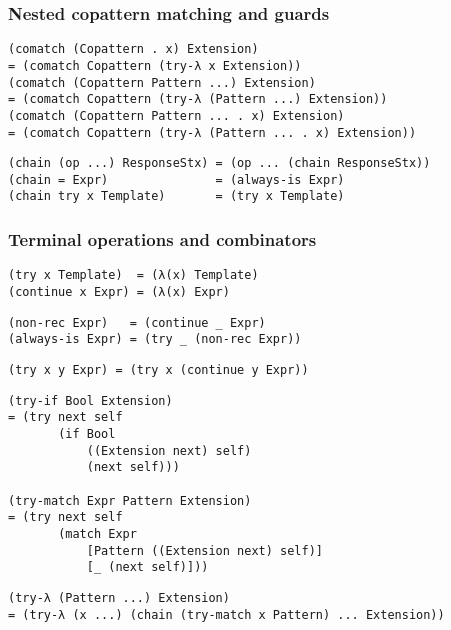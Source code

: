 \subsubsection{Nested copattern matching and guards}

\begin{verbatim}
(comatch (Copattern . x) Extension)
= (comatch Copattern (try-λ x Extension))
(comatch (Copattern Pattern ...) Extension)
= (comatch Copattern (try-λ (Pattern ...) Extension))
(comatch (Copattern Pattern ... . x) Extension)
= (comatch Copattern (try-λ (Pattern ... . x) Extension))
\end{verbatim}

\begin{verbatim}
(chain (op ...) ResponseStx) = (op ... (chain ResponseStx))
(chain = Expr)               = (always-is Expr)
(chain try x Template)       = (try x Template)
\end{verbatim}

\subsubsection{Terminal operations and combinators}

\begin{verbatim}
(try x Template)  = (λ(x) Template)
(continue x Expr) = (λ(x) Expr)
\end{verbatim}

\begin{verbatim}
(non-rec Expr)   = (continue _ Expr)
(always-is Expr) = (try _ (non-rec Expr))
\end{verbatim}

\begin{verbatim}
(try x y Expr) = (try x (continue y Expr))
\end{verbatim}

\begin{verbatim}
(try-if Bool Extension)
= (try next self
       (if Bool
           ((Extension next) self)
           (next self)))

(try-match Expr Pattern Extension)
= (try next self
       (match Expr
           [Pattern ((Extension next) self)]
           [_ (next self)]))
\end{verbatim}

\begin{verbatim}
(try-λ (Pattern ...) Extension)
= (try-λ (x ...) (chain (try-match x Pattern) ... Extension))
\end{verbatim}

